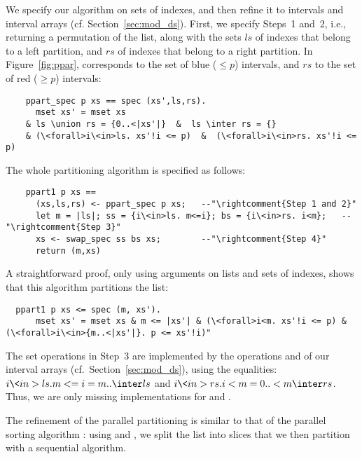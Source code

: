 \documentclass[sn-mathphys,Numbered]{sn-jnl}
\theoremstyle{thmstyleone}%
\theoremstyle{definition}%
\theoremstyle{thmstylethree}%
\begin{document}
  We specify our algorithm on sets of indexes, and then refine it to intervals and interval arrays (cf. Section~\ref{sec:mod_ds}).
  First, we specify Steps~1 and~2, i.e., returning a permutation of the list, along with the sets \is$ls$ of
  indexes that belong to a left partition, and \is$rs$ of indexes that belong to a right partition. In Figure~\ref{fig:ppar},
   corresponds to the set of blue ($\le p$) intervals, and \is$rs$ to the set of red ($\ge p$) intervals:
  \begin{lstlisting}
    ppart_spec p xs == spec (xs',ls,rs).
      mset xs' = mset xs
    & ls \union rs = {0..<|xs'|}  &  ls \inter rs = {}
    & (\<forall>i\<in>ls. xs'!i <= p)  &  (\<forall>i\<in>rs. xs'!i <= p)
  \end{lstlisting}

  The whole partitioning algorithm is specified as follows:
  \begin{lstlisting}
    ppart1 p xs ==
      (xs,ls,rs) <- ppart_spec p xs;   --"\rightcomment{Step 1 and 2}"
      let m = |ls|; ss = {i\<in>ls. m<=i}; bs = {i\<in>rs. i<m};   --"\rightcomment{Step 3}"
      xs <- swap_spec ss bs xs;        --"\rightcomment{Step 4}"
      return (m,xs)
  \end{lstlisting}
  A straightforward proof, only using arguments on lists and sets of indexes, shows that this algorithm partitions the list:
  \begin{lstlisting}
  ppart1 p xs <= spec (m, xs').
      mset xs' = mset xs & m <= |xs'| & (\<forall>i<m. xs'!i <= p) & (\<forall>i\<in>{m..<|xs'|}. p <= xs'!i)"
  \end{lstlisting}

  The set operations in Step~3 are implemented by the operations  and  of our interval arrays (cf.~Section~\ref{sec:mod_ds}),
  using the equalities: \is$ {i\<in>ls. m<=i} = {m..} \inter ls$ and \is${i\<in>rs. i<m} = {0..<m} \inter rs$.
  Thus, we are only missing implementations for  and .

  The refinement of the parallel partitioning  is similar to that of the parallel sorting algorithm :
  using  and , we split the list into slices that we then partition with a sequential algorithm.
\end{document}

